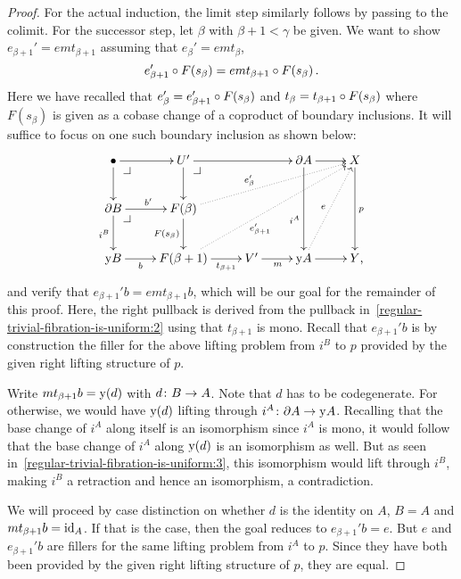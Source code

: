 \documentclass[reqno,10pt,a4paper,oneside,draft]{amsart}
\begin{document}
\begin{proof}
For the actual induction, the limit step similarly follows by passing to the colimit.
For the successor step, let $\beta$ with $\beta + 1 < \gamma$ be given.
We want to show $e_{\beta+1}' = e m t_{\beta+1}$ assuming that $e_{\beta}' = e m t_{\beta}$, \ie
\begin{equation} \label{regular-trivial-fibration-is-uniform:ih}
  e_{\beta+1}' \mathbin{\circ} F(s_{\beta}) = e m t_{\beta+1} \mathbin{\circ} F(s_{\beta}) \, .
\end{equation}
Here we have recalled that $e_{\beta}' = e_{\beta+1}' \mathbin{\circ} F(s_{\beta})$ and $t_{\beta} = t_{\beta+1} \mathbin{\circ} F(s_{\beta})$ where $F(s_{\beta})$ is given as a cobase change of a coproduct of boundary inclusions.
It will suffice to focus on one such boundary inclusion as shown below:
\begin{equation} \label{regular-trivial-fibration-is-uniform:3}
\xycenter{
  \bullet
  \ar[r]
  \ar[d]
  \pullback{dr}
&
  U'
  \ar[rr]
  \ar[d]
  \pullback{dr}
&&
  \partial A
  \ar[r]
  \ar[dd]_(0.6){i^A}
&
  X
  \ar[dd]^{p}
\\
  \partial B
  \ar[r]^{b'}
  \ar[d]_{i^B}
  \pullback{dr}
&
  F(\beta)
  \ar[d]_{F(s_{\beta})}
  \ar@{.>}[urrr]^(0.4){e_{\beta}'}
\\
  \yon B
  \ar[r]_-{b}
&
  F(\beta+1)
  \ar[r]_-{t_{\beta+1}}
  \ar@{.>}[uurrr]_(0.4){e_{\beta+1}'}
&
  V'
  \ar[r]_{m}
&
  \yon A
  \ar[r]
  \ar@{.>}[uur]^{e}
&
  Y
\rlap{,}}
\end{equation}
and verify that $e_{\beta+1}' b = e m t_{\beta+1} b$, which will be our goal for the remainder of this proof.
Here, the right pullback is derived from the pullback in~\eqref{regular-trivial-fibration-is-uniform:2} using that $t_{\beta+1}$ is mono.
Recall that $e_{\beta+1}' b$ is by construction the filler for the above lifting problem from $i^B$ to $p$ provided by the given right lifting structure of $p$.

Write $m t_{\beta+1} b = \mathrm{y}(d)$ with $d \colon B \to A$.
Note that $d$ has to be codegenerate.
For otherwise, we would have $\mathrm{y}(d)$ lifting through $i^A \colon \partial A \to \mathrm{y} A$.
Recalling that the base change of $i^A$ along itself is an isomorphism since $i^A$ is mono, it would follow that the base change of $i^A$ along $\mathrm{y}(d)$ is an isomorphism as well.
But as seen in~\eqref{regular-trivial-fibration-is-uniform:3}, this isomorphism would lift through $i^B$, making $i^B$ a retraction and hence an isomorphism, a contradiction.

We will proceed by case distinction on whether $d$ is the identity on $A$, \ie $B = A$ and $m t_{\beta+1} b = \operatorname{id}_A$.
If that is the case, then the goal reduces to $e_{\beta+1}' b = e$.
But $e$ and $e_{\beta+1}' b$ are fillers for the same lifting problem from $i^A$ to $p$.
Since they have both been provided by the given right lifting structure of $p$, they are equal.


\end{proof}
\end{document}
